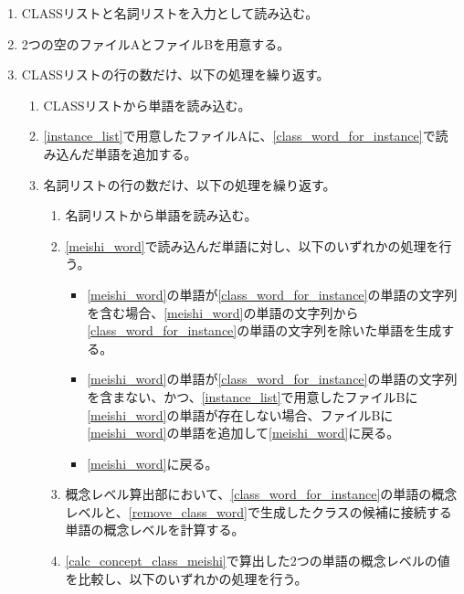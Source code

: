 \begin{enumerate}
    \item CLASSリストと名詞リストを入力として読み込む。
    \item 2つの空のファイルAとファイルBを用意する。
    \label{instance_list}
    \item CLASSリストの行の数だけ、以下の処理を繰り返す。
        \begin{enumerate}
            \item CLASSリストから単語を読み込む。
            \label{class_word_for_instance}
            \item \ref{instance_list}で用意したファイルAに、\ref{class_word_for_instance}で読み込んだ単語を追加する。
            \label{instance_list2}
            \item 名詞リストの行の数だけ、以下の処理を繰り返す。
            \label{loop_meishi_list}
                \begin{enumerate}
                    \item 名詞リストから単語を読み込む。
                    \label{meishi_word}
                    \item \ref{meishi_word}で読み込んだ単語に対し、以下のいずれかの処理を行う。
                        \begin{itemize}
                            \item \ref{meishi_word}の単語が\ref{class_word_for_instance}の単語の文字列を含む場合、\ref{meishi_word}の単語の文字列から\ref{class_word_for_instance}の単語の文字列を除いた単語を生成する。
                            \label{remove_class_word}
                            \item \ref{meishi_word}の単語が\ref{class_word_for_instance}の単語の文字列を含まない、かつ、\ref{instance_list}で用意したファイルBに\ref{meishi_word}の単語が存在しない場合、ファイルBに\ref{meishi_word}の単語を追加して\ref{meishi_word}に戻る。
                            \item \ref{meishi_word}に戻る。
                        \end{itemize}
                    \item 概念レベル算出部において、\ref{class_word_for_instance}の単語の概念レベルと、\ref{remove_class_word}で生成したクラスの候補に接続する単語の概念レベルを計算する。
                    \label{calc_concept_class_meishi}
                    \item \ref{calc_concept_class_meishi}で算出した2つの単語の概念レベルの値を比較し、以下のいずれかの処理を行う。
                        \begin{enumerate}

\end{enumerate}
\end{enumerate}
\end{enumerate}
\end{enumerate}
